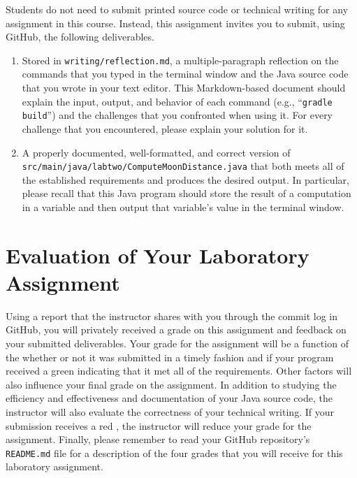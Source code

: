 \documentclass[11pt]{article}
\newcommand{\mainprogramsource}{\lstinline{src/main/java/labtwo/ComputeMoonDistance.java}}
\newcommand{\reflection}{\lstinline{writing/reflection.md}}
\newcommand{\command}[1]{``\lstinline{#1}''}
\newcommand{\program}[1]{\lstinline{#1}}
\newcommand{\checkmark}{\ding{51}}
\newcommand{\naughtmark}{\ding{55}}
\begin{document}
\noindent Students do not need to submit printed source code or technical
writing for any assignment in this course. Instead, this assignment invites you
to submit, using GitHub, the following deliverables.

\begin{enumerate}

\setlength{\itemsep}{0in}

\item Stored in \reflection{}, a multiple-paragraph reflection on the commands
  that you typed in the terminal window and the Java source code that you wrote
  in your text editor. This Markdown-based document should explain the input,
  output, and behavior of each command (e.g., \command{gradle build}) and the
  challenges that you confronted when using it. For every challenge that you
  encountered, please explain your solution for it.

\item A properly documented, well-formatted, and correct version of
  \mainprogramsource{} that both meets all of the established requirements and
  produces the desired output. In particular, please recall that this Java
  program should store the result of a computation in a variable and then output
  that variable's value in the terminal window.

\end{enumerate}

\section*{Evaluation of Your Laboratory Assignment}

Using a report that the instructor shares with you through the commit log in
GitHub, you will privately received a grade on this assignment and feedback on
your submitted deliverables. Your grade for the assignment will be a function of
the whether or not it was submitted in a timely fashion and if your program
received a green \checkmark{} indicating that it met all of the requirements.
Other factors will also influence your final grade on the assignment. In
addition to studying the efficiency and effectiveness and documentation of your
Java source code, the instructor will also evaluate the correctness of your
technical writing. If your submission receives a red \naughtmark{}, the
instructor will reduce your grade for the assignment. Finally, please remember
to read your GitHub repository's \program{README.md} file for a description of
the four grades that you will receive for this laboratory assignment.
\end{document}

